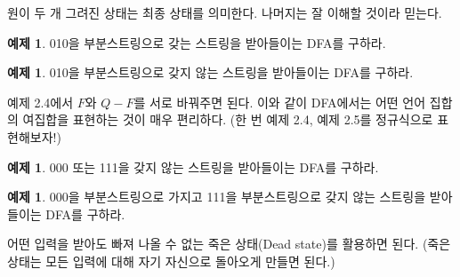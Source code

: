\documentclass[b5paper, 10pt]{book}
\theoremstyle{definition}
\newtheorem{ex}[defn]{예제}
\begin{document}
원이 두 개 그려진 상태는 최종 상태를 의미한다. 나머지는 잘 이해할 것이라 믿는다. 
\begin{ex}
    010을 부분스트링으로 갖는 스트링을 받아들이는 DFA를 구하라.
\end{ex}

\begin{figure}[ht]
    \centering
    \caption{} 
    \label{010}
\end{figure}
\begin{ex}
    010을 부분스트링으로 갖지 않는 스트링을 받아들이는 DFA를 구하라.
\end{ex}
예제 2.4에서 $F$와 $Q-F$를 서로 바꿔주면 된다. 이와 같이 DFA에서는 어떤 언어 집합의
여집합을 표현하는 것이 매우 편리하다. (한 번 예제 2.4, 예제 2.5를 정규식으로 표현해보자!) 
\begin{ex}
    000 또는 111을 갖지 않는 스트링을 받아들이는 DFA를 구하라.
\end{ex}

\begin{ex}
    000을 부분스트링으로 가지고 111을 부분스트링으로 갖지 않는 스트링을 받아들이는 DFA를 구하라.
\end{ex}
어떤 입력을 받아도 빠져 나올 수 없는 죽은 상태(Dead state)를 활용하면 된다. (죽은 
상태는 모든 입력에
대해 자기 자신으로 돌아오게 만들면 된다.)
\end{document}
